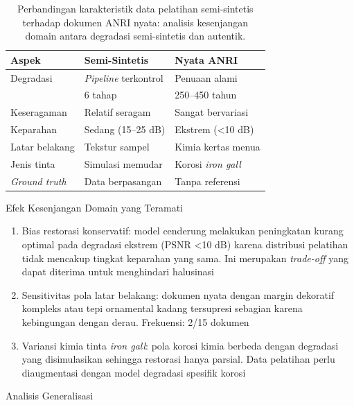 \documentclass[12pt,a4paper]{article}
\begin{document}
\begin{table}[!t]
\renewcommand{\arraystretch}{1.15}
\caption{Perbandingan karakteristik data pelatihan semi-sintetis terhadap dokumen ANRI nyata: analisis kesenjangan domain antara degradasi semi-sintetis dan autentik.}
\label{table:synthetic_vs_real_comparison}
\centering
\begin{tabular}{|p{2.5cm}|p{2.8cm}|p{2.8cm}|}
\hline
\textbf{Aspek} & \textbf{Semi-Sintetis} & \textbf{Nyata ANRI} \\
\hline
Degradasi & \textit{Pipeline} terkontrol & Penuaan alami \\
& 6 tahap & 250--450 tahun \\
\hline
Keseragaman & Relatif seragam & Sangat bervariasi \\
\hline
Keparahan & Sedang (15--25 dB) & Ekstrem (<10 dB) \\
\hline
Latar belakang & Tekstur sampel & Kimia kertas menua \\
\hline
Jenis tinta & Simulasi memudar & Korosi \textit{iron gall} \\
\hline
\textit{Ground truth} & Data berpasangan & Tanpa referensi \\
\hline
\end{tabular}
\end{table}

Efek Kesenjangan Domain yang Teramati
\begin{enumerate}[nosep]
    \item Bias restorasi konservatif: model cenderung melakukan peningkatan kurang optimal pada degradasi ekstrem (PSNR <10 dB) karena distribusi pelatihan tidak mencakup tingkat keparahan yang sama. Ini merupakan \textit{trade-off} yang dapat diterima untuk menghindari halusinasi
    
    \item Sensitivitas pola latar belakang: dokumen nyata dengan margin dekoratif kompleks atau tepi ornamental kadang tersupresi sebagian karena kebingungan dengan derau. Frekuensi: 2/15 dokumen
    
    \item Variansi kimia tinta \textit{iron gall}: pola korosi kimia berbeda dengan degradasi yang disimulasikan sehingga restorasi hanya parsial. Data pelatihan perlu diaugmentasi dengan model degradasi spesifik korosi
\end{enumerate}

Analisis Generalisasi
\end{document}
